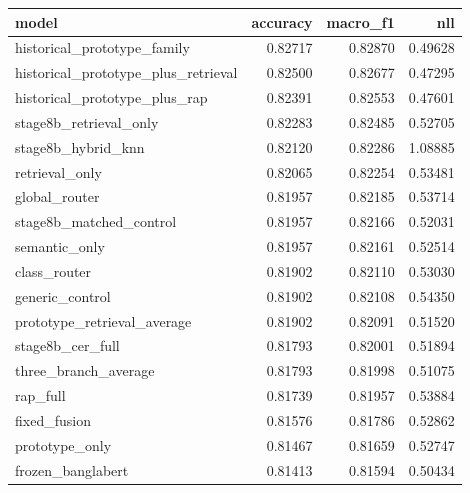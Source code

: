 \begin{tabular}{lrrr}
\toprule
model & accuracy & macro_f1 & nll \\
\midrule
historical_prototype_family & 0.82717 & 0.82870 & 0.49628 \\
historical_prototype_plus_retrieval & 0.82500 & 0.82677 & 0.47295 \\
historical_prototype_plus_rap & 0.82391 & 0.82553 & 0.47601 \\
stage8b_retrieval_only & 0.82283 & 0.82485 & 0.52705 \\
stage8b_hybrid_knn & 0.82120 & 0.82286 & 1.08885 \\
retrieval_only & 0.82065 & 0.82254 & 0.53481 \\
global_router & 0.81957 & 0.82185 & 0.53714 \\
stage8b_matched_control & 0.81957 & 0.82166 & 0.52031 \\
semantic_only & 0.81957 & 0.82161 & 0.52514 \\
class_router & 0.81902 & 0.82110 & 0.53030 \\
generic_control & 0.81902 & 0.82108 & 0.54350 \\
prototype_retrieval_average & 0.81902 & 0.82091 & 0.51520 \\
stage8b_cer_full & 0.81793 & 0.82001 & 0.51894 \\
three_branch_average & 0.81793 & 0.81998 & 0.51075 \\
rap_full & 0.81739 & 0.81957 & 0.53884 \\
fixed_fusion & 0.81576 & 0.81786 & 0.52862 \\
prototype_only & 0.81467 & 0.81659 & 0.52747 \\
frozen_banglabert & 0.81413 & 0.81594 & 0.50434 \\
\bottomrule
\end{tabular}
